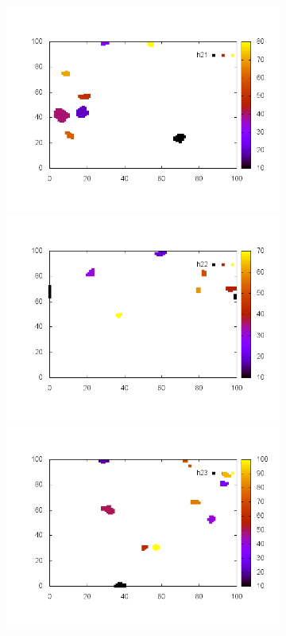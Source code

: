 \documentclass[10pt,a4paper]{article}
\begin{document}
\begin{figure}
\begin{subfigure}[b]{1\textwidth}
\end{subfigure}
\begin{subfigure}[b]{1\textwidth}
\includegraphics[scale=.3]{./img/SCC_Stable3/cut95p/21.png}
\includegraphics[scale=.3]{./img/SCC_Stable3/cut95p/22.png}
\includegraphics[scale=.3]{./img/SCC_Stable3/cut95p/23.png}

\end{subfigure}
\end{figure}
\end{document}
